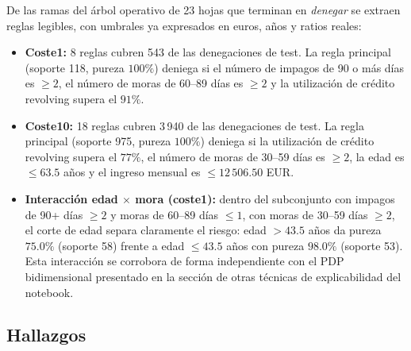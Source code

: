 \documentclass[11pt,a4paper]{article}
\begin{document}
De las ramas del árbol operativo de 23 hojas que terminan en \emph{denegar} se extraen reglas legibles, con umbrales ya expresados en euros, años y ratios reales:

\begin{itemize}
\item \textbf{Coste1:} 8 reglas cubren 543 de las denegaciones de test. La regla principal (soporte 118, pureza $100\%$) deniega si el número de impagos de 90 o más días es $\geq 2$, el número de moras de 60--89 días es $\geq 2$ y la utilización de crédito revolving supera el $91\%$.
\item \textbf{Coste10:} 18 reglas cubren 3\,940 de las denegaciones de test. La regla principal (soporte 975, pureza $100\%$) deniega si la utilización de crédito revolving supera el $77\%$, el número de moras de 30--59 días es $\geq 2$, la edad es $\leq 63.5$ años y el ingreso mensual es $\leq 12\,506.50$ EUR.
\item \textbf{Interacción edad $\times$ mora (coste1):} dentro del subconjunto con impagos de 90+ días $\geq 2$ y moras de 60--89 días $\leq 1$, con moras de 30--59 días $\geq 2$, el corte de edad separa claramente el riesgo: edad $> 43.5$ años da pureza $75.0\%$ (soporte 58) frente a edad $\leq 43.5$ años con pureza $98.0\%$ (soporte 53). Esta interacción se corrobora de forma independiente con el PDP bidimensional presentado en la sección de otras técnicas de explicabilidad del notebook.
\end{itemize}

\subsection{Hallazgos}
\end{document}
